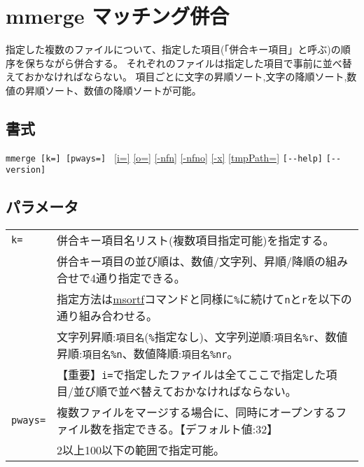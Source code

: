 
%

\section{mmerge マッチング併合\label{sect:mmerge}}
指定した複数のファイルについて、指定した項目(「併合キー項目」と呼ぶ)の順序を保ちながら併合する。
それぞれのファイルは指定した項目で事前に並べ替えておかなければならない。
項目ごとに文字の昇順ソート,文字の降順ソート,数値の昇順ソート、数値の降順ソートが可能。

\subsection*{書式}
\verb|mmerge [k=] [pways=] |
\hyperref[sect:option_i]{[i=]}
\hyperref[sect:option_o]{[o=]}
\hyperref[sect:option_nfn]{[-nfn]} 
\hyperref[sect:option_nfno]{[-nfno]}  
\hyperref[sect:option_x]{[-x]}
\hyperref[sect:option_tmpPath]{[tmpPath=]} 
\verb|[--help]|
\verb|[--version]|\\

\subsection*{パラメータ}
\begin{table}[htbp]
{\small
\begin{tabular}{ll}
\verb|k=|      & 併合キー項目名リスト(複数項目指定可能)を指定する。\\
               & 併合キー項目の並び順は、数値/文字列、昇順/降順の組み合せで4通り指定できる。\\
               & 指定方法は\hyperref[sect:msortf]{msortf}コマンドと同様に\verb|%|に続けて\verb|n|と\verb|r|を以下の通り組み合わせる。\\
               & 文字列昇順:\verb|項目名|(\verb|%|指定なし)、文字列逆順:\verb|項目名%r|、数値昇順:\verb|項目名%n|、数値降順:\verb|項目名%nr|。\\
               & 【重要】\verb|i=|で指定したファイルは全てここで指定した項目/並び順で並べ替えておかなければならない。\\
\verb|pways=|  & 複数ファイルをマージする場合に、同時にオープンするファイル数を指定できる。【デフォルト値:32】\\
               & 2以上100以下の範囲で指定可能。\\
\end{tabular} 
}
\end{table} 

